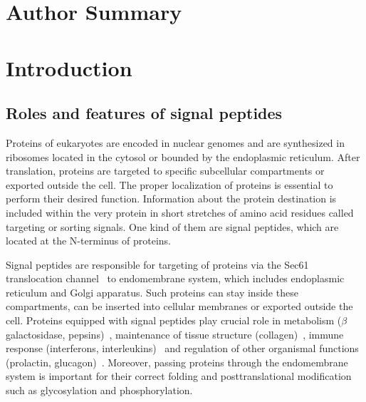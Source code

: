 \documentclass[10pt,letterpaper]{article}
\begin{document}
\section*{Author Summary}


\linenumbers

\section*{Introduction}
\subsection*{Roles and features of signal peptides}

Proteins of eukaryotes are encoded in nuclear genomes and are synthesized in ribosomes located in the cytosol or bounded by the endoplasmic reticulum. After translation, proteins are targeted to specific subcellular compartments or exported outside the cell. The proper localization of proteins is essential to perform their desired function. Information about the protein destination is included within the very protein in short stretches of amino acid residues called targeting or sorting signals. One kind of them are signal peptides, which are located at the N-terminus of proteins.

Signal peptides are responsible for targeting of proteins via the Sec61 translocation channel~\cite{2007rapoportprotein} to endomembrane system, which includes endoplasmic reticulum and Golgi apparatus. Such proteins can stay inside these compartments, can be inserted into cellular membranes or exported outside the cell. Proteins equipped with signal peptides play crucial role in metabolism ($\beta$ galactosidase, pepsins)~\cite{1991hofmannmutations}, maintenance of tissue structure (collagen)~\cite{2001chanaberrant}, immune response (interferons, interleukins)~\cite{2005zhangalteration} and regulation of other organismal functions (prolactin, glucagon)~\cite{2010huangrole}. Moreover, passing proteins through the endomembrane system is important for their correct folding and posttranslational modification such as glycosylation and phosphorylation.
\end{document}
